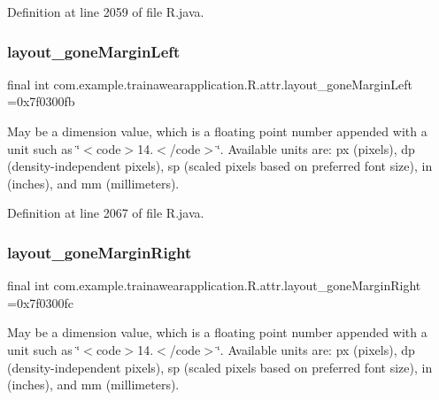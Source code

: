 Definition at line 2059 of file R.\+java.

\mbox{\label{classcom_1_1example_1_1trainawearapplication_1_1_r_1_1attr_a1e84d4025e84fa8f1fa9982bceea7a3e}} 
\subsubsection{\texorpdfstring{layout\_goneMarginLeft}{layout\_goneMarginLeft}}
{\footnotesize\ttfamily final int com.\+example.\+trainawearapplication.\+R.\+attr.\+layout\+\_\+gone\+Margin\+Left =0x7f0300fb\hspace{0.3cm}{\ttfamily [static]}}

May be a dimension value, which is a floating point number appended with a unit such as \char`\"{}$<$code$>$14.\+5sp$<$/code$>$\char`\"{}. Available units are\+: px (pixels), dp (density-\/independent pixels), sp (scaled pixels based on preferred font size), in (inches), and mm (millimeters). 

Definition at line 2067 of file R.\+java.

\mbox{\label{classcom_1_1example_1_1trainawearapplication_1_1_r_1_1attr_a55cb89b09c81ad684916c8cbb29fa7a7}} 
\subsubsection{\texorpdfstring{layout\_goneMarginRight}{layout\_goneMarginRight}}
{\footnotesize\ttfamily final int com.\+example.\+trainawearapplication.\+R.\+attr.\+layout\+\_\+gone\+Margin\+Right =0x7f0300fc\hspace{0.3cm}{\ttfamily [static]}}

May be a dimension value, which is a floating point number appended with a unit such as \char`\"{}$<$code$>$14.\+5sp$<$/code$>$\char`\"{}. Available units are\+: px (pixels), dp (density-\/independent pixels), sp (scaled pixels based on preferred font size), in (inches), and mm (millimeters). 

